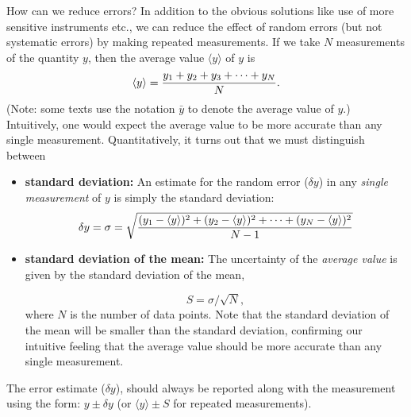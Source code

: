      How can we reduce errors?  In addition to the obvious
solutions like  use of more sensitive instruments
etc., we can reduce the effect of random errors (but not systematic errors)
by making repeated
measurements.  If we take $N$ measurements of the quantity
$y$, then the average value $\langle y \rangle$ of $y$ is
\[
\langle y \rangle = {{y_{1} + y_{2} + y_{3} + \cdots + y_{N}} \over
{N}}.
\]
(Note: some texts use the notation $\bar{y}$ to denote
the average value of $y$.)
Intuitively, one would expect the average value to be more accurate
than any single measurement.  Quantitatively, it turns out that we
must distinguish between

\begin{itemize}
\item {\bf standard deviation:} An estimate for the random error
($\delta y$) in any {\em single measurement} of $y$ is simply the
standard deviation:
\[
\delta y = \sigma = \sqrt{{{(y_{1} - \langle y \rangle)^{2} +
   (y_{2} - \langle y \rangle)^{2} + \cdots +(y_{N} - \langle y \rangle)^{2}}
    \over {N - 1}}}
\]

\item {\bf standard deviation of the mean:} The uncertainty of the
{\em average value} is given by the standard deviation
of the mean, \label{sdev.mean}


\[
S = \sigma / \sqrt{N},
\]
where $N$ is the number of data points.  Note that the standard
deviation of the mean will be smaller than the standard deviation,
confirming our intuitive feeling that the average value should be more
accurate than any single measurement.
\end{itemize}

     The error estimate ($\delta y$), should always be reported along
with the measurement using the form: $y \pm \delta y$ (or
$\langle y \rangle \pm S$ for
repeated measurements).


